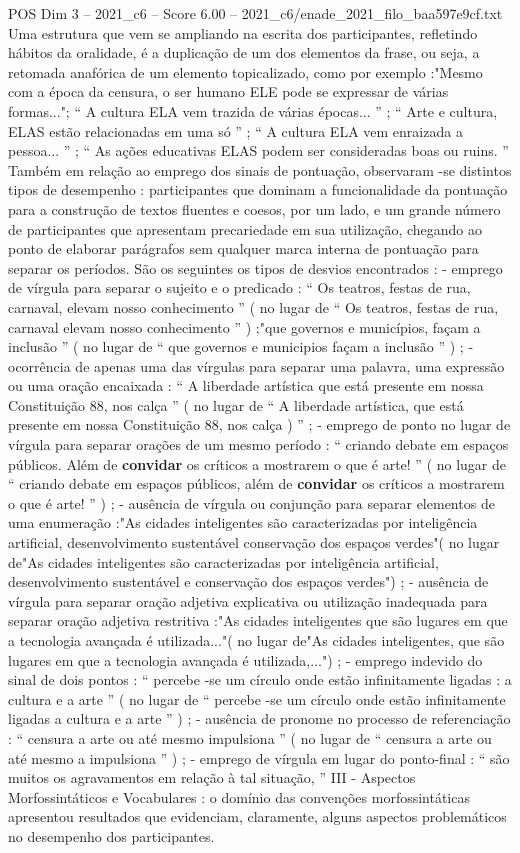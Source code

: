 \begin{textsample}{POS Dim 3 – 2021\_c6 – Score 6.00 – 2021\_c6/enade\_2021\_filo\_baa597e9cf.txt}
Uma estrutura que vem se ampliando na escrita dos participantes, refletindo hábitos da oralidade, é a duplicação de um dos elementos da frase, ou seja, a retomada anafórica de um elemento topicalizado, como por exemplo :"Mesmo com a época da censura, o ser humano ELE pode se expressar de várias formas..."; “ A cultura ELA vem trazida de várias épocas... ” ; “ Arte e cultura, ELAS estão relacionadas em uma só ” ; “ A cultura ELA vem enraizada a pessoa... ” ; “ As ações educativas ELAS podem ser consideradas boas ou ruins. ” Também em relação ao emprego dos sinais de pontuação, observaram -se distintos tipos de desempenho : participantes que dominam a funcionalidade da pontuação para a construção de textos fluentes e coesos, por um lado, e um grande número de participantes que apresentam precariedade em sua utilização, chegando ao ponto de elaborar parágrafos sem qualquer marca interna de pontuação para separar os períodos.
São os seguintes os tipos de desvios encontrados : - emprego de vírgula para separar o sujeito e o predicado : “ Os teatros, festas de rua, carnaval, elevam nosso conhecimento ” ( no lugar de “ Os teatros, festas de rua, carnaval elevam nosso conhecimento ” ) ;"que governos e municípios, façam a inclusão ” ( no lugar de “ que governos e municipios façam a inclusão ” ) ; - ocorrência de apenas uma das vírgulas para separar uma palavra, uma expressão ou uma oração encaixada : “ A liberdade artística que está presente em nossa Constituição 88, nos calça ” ( no lugar de “ A liberdade artística, que está presente em nossa Constituição 88, nos calça ) ” ; - emprego de ponto no lugar de vírgula para separar orações de um mesmo período : “ criando debate em espaços públicos.
Além de \textbf{convidar} os críticos a mostrarem o que é arte! ” ( no lugar de “ criando debate em espaços públicos, além de \textbf{convidar} os críticos a mostrarem o que é arte! ” ) ; - ausência de vírgula ou conjunção para separar elementos de uma enumeração :"As cidades inteligentes são caracterizadas por inteligência artificial, desenvolvimento sustentável conservação dos espaços verdes"( no lugar de"As cidades inteligentes são caracterizadas por inteligência artificial, desenvolvimento sustentável e conservação dos espaços verdes") ; - ausência de vírgula para separar oração adjetiva explicativa ou utilização inadequada para separar oração adjetiva restritiva :"As cidades inteligentes que são lugares em que a tecnologia avançada é utilizada..."( no lugar de"As cidades inteligentes, que são lugares em que a tecnologia avançada é utilizada,...") ; - emprego indevido do sinal de dois pontos : “ percebe -se um círculo onde estão infinitamente ligadas : a cultura e a arte ” ( no lugar de “ percebe -se um círculo onde estão infinitamente ligadas a cultura e a arte ” ) ; - ausência de pronome no processo de referenciação : “ censura a arte ou até mesmo impulsiona ” ( no lugar de “ censura a arte ou até mesmo a impulsiona ” ) ; - emprego de vírgula em lugar do ponto-final : “ são muitos os agravamentos em relação à tal situação, ” III - Aspectos Morfossintáticos e Vocabulares : o domínio das convenções morfossintáticas apresentou resultados que evidenciam, claramente, alguns aspectos problemáticos no desempenho dos participantes.

\end{textsample}
